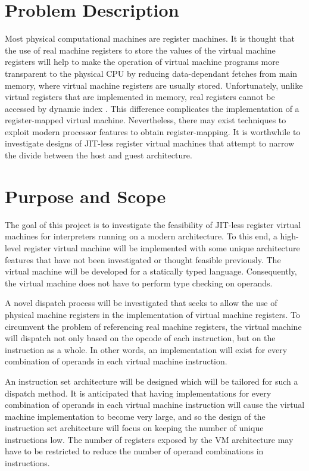 	\section{Problem Description}
		Most physical computational machines are register machines. It is thought that the use of real machine registers to store the values of the virtual machine registers will help to make the operation of virtual machine programs more transparent to the physical CPU by reducing data-dependant fetches from main memory, where virtual machine registers are usually stored. Unfortunately, unlike virtual registers that are implemented in memory, real registers cannot be accessed by dynamic index \citep{caseregistervm}. This difference complicates the implementation of a register-mapped virtual machine. Nevertheless, there may exist techniques to exploit modern processor features to obtain register-mapping. It is worthwhile to investigate designs of JIT-less register virtual machines that attempt to narrow the divide between the host and guest architecture.
		
	\section{Purpose and Scope}
		The goal of this project is to investigate the feasibility of JIT-less register virtual machines for interpreters running on a modern architecture. To this end, a high-level register virtual machine will be implemented with some unique architecture features that have not been investigated or thought feasible previously. The virtual machine will be developed for a statically typed language. Consequently, the virtual machine does not have to perform type checking on operands.
		
		A novel dispatch process will be investigated that seeks to allow the use of physical machine registers in the implementation of virtual machine registers. To circumvent the problem of referencing real machine registers, the virtual machine will dispatch not only based on the opcode of each instruction, but on the instruction as a whole. In other words, an implementation will exist for every combination of operands in each virtual machine instruction.
	
		An instruction set architecture will be designed which will be tailored for such a dispatch method. It is anticipated that having implementations for every combination of operands in each virtual machine instruction will cause the virtual machine implementation to become very large, and so the design of the instruction set architecture will focus on keeping the number of unique instructions low. The number of registers exposed by the VM architecture may have to be restricted to reduce the number of operand combinations in instructions.
		
